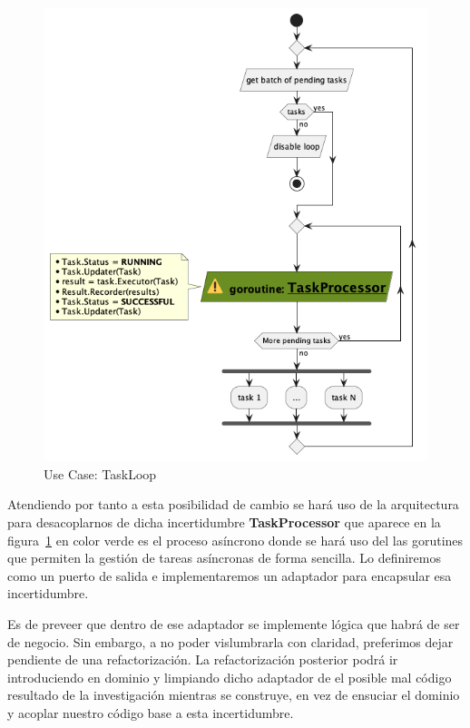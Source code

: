 \begin{figure}[H]
    \centering
    \includegraphics[height=0.3\textheight]{./part/Proyecto_ejecutivo/memoria_descriptiva/descripcionDelProyecto/manager/uml/executeTaskLoop}
    \caption{Use Case: TaskLoop}\label{fig:Use Case-TaskLoop}
\end{figure}

Atendiendo por tanto a esta posibilidad de cambio se hará uso de la arquitectura para desacoplarnos de dicha incertidumbre \textbf{TaskProcessor} que aparece en la figura~\cref{fig:Use Case-TaskLoop} en color verde es el proceso asíncrono donde se hará uso del las gorutines que permiten la gestión de tareas asíncronas de forma sencilla. Lo definiremos como un puerto de salida e implementaremos un adaptador para encapsular esa incertidumbre.

Es de preveer que dentro de ese adaptador se implemente lógica que habrá de ser de negocio. Sin embargo, a no poder vislumbrarla con claridad, preferimos dejar pendiente de una refactorización. La refactorización posterior podrá ir introduciendo en dominio y limpiando dicho adaptador de el posible mal código resultado de la investigación mientras se construye, en vez de ensuciar el dominio y acoplar nuestro código base a esta incertidumbre.

